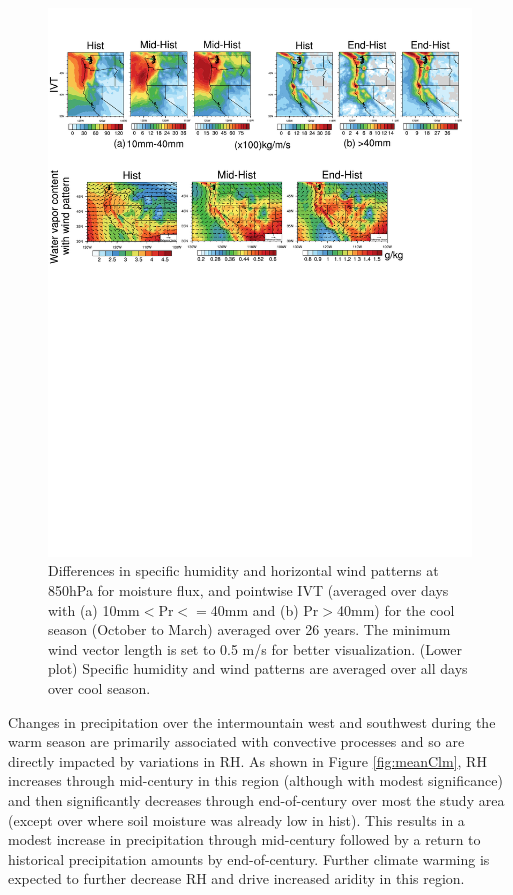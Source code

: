\begin{figure}
\begin{center}
\includegraphics[width=6in]{discussion_indices.pdf}
\caption{Differences in specific humidity and horizontal wind patterns at 850hPa for moisture flux, and pointwise IVT (averaged over days with (a) 10mm$<$Pr$<=$40mm and (b) Pr$>$40mm) for the cool season (October to March) averaged over 26 years. The minimum wind vector length is set to 0.5 m/s for better visualization. (Lower plot) Specific humidity and wind patterns are averaged over all days over cool season.}
\label{fig:discussIndex}
\end{center}
\end{figure}

Changes in precipitation over the intermountain west and southwest during the warm season are primarily associated with convective processes and so are directly impacted by variations in RH.  As shown in Figure \ref{fig:meanClm}, RH increases through mid-century in this region (although with modest significance) and then significantly decreases through end-of-century over most the study area (except over where soil moisture was already low in \textsf{hist}).  This results in a modest increase in precipitation through mid-century followed by a return to historical precipitation amounts by end-of-century.  Further climate warming is expected to further decrease RH and drive increased aridity in this region.


